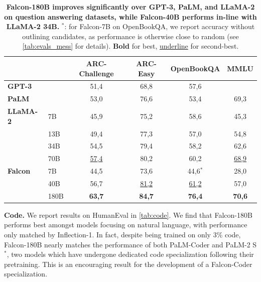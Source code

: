 \documentclass{article}
\DeclareRobustCommand{\performance}[1]{\textcolor{JungleGreen}{#1}}
\begin{document}
\begin{table}[b]
\vspace{-0.2in}
\caption{\textbf{\performance{Falcon-180B improves significantly over GPT-3, PaLM, and LLaMA-2 on question answering datasets, while Falcon-40B performs in-line with LLaMA-2 34B.}} $^*$: for Falcon-7B on OpenBookQA, we report accuracy without outlining candidates, as performance is otherwise close to random (see \cref{tab:evals_mess} for details). \textbf{Bold} for best, \underline{underline} for second-best.}
\label{tab:qa}
\centering
\vspace{0.1in}
\begin{tabular}{llcccc}
\toprule
                 &      & \textbf{ARC-Challenge} & \textbf{ARC-Easy} & \textbf{OpenBookQA} & \textbf{MMLU} \\ \midrule
\textbf{GPT-3}   &      & 51,4                   & 68,8              & 57,6                &               \\
\textbf{PaLM}    &      & 53,0                   & 76,6              & 53,4                & 69,3          \\
\textbf{LLaMA-2} & 7B   & 45,9                   & 75,2              & 58,6                & 45,3          \\
\textbf{}        & 13B  & 49,4                   & 77,3              & 57,0                & 54,8          \\
\textbf{}        & 34B  & 54,5                   & 79,4              & 58,2                & 62,6          \\
\textbf{}        & 70B  & \underline{57,4}             & 80,2              & 60,2                & \underline{68,9}    \\ \midrule
\textbf{Falcon}  & 7B   & 44,5                   & 73,6              & 44,6$^*$            & 28,0          \\
\textbf{}        & 40B  & 56,7                   & \underline{81,2}        & \underline{61,2}          & 57,0          \\
\textbf{}        & 180B & \textbf{63,7}          & \textbf{84,7}     & \textbf{76,4}       & \textbf{70,6} \\ \bottomrule
\end{tabular}
\end{table}

\textbf{Code.} We report results on HumanEval in \cref{tab:code}. We find that Falcon-180B performs best amongst models focusing on natural language, with performance only matched by Inflection-1. In fact, despite being trained on only 3\% code, Falcon-180B nearly matches the performance of both PaLM-Coder and PaLM-2 S$^*$, two models which have undergone dedicated code specialization following their pretraining. This is an encouraging result for the development of a Falcon-Coder specialization.
\end{document}
